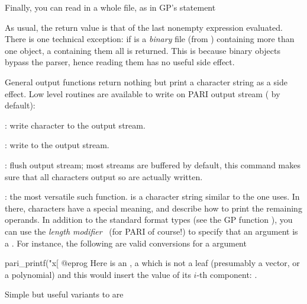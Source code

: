 Finally, you can read in a whole file, as in GP's  statement


\noindent As usual, the return value is that of the last nonempty expression
evaluated. There is one technical exception: if  is a \emph{binary}
file (from ) containing more than one object, a 
containing them all is returned. This is because binary objects bypass the
parser, hence reading them has no useful side effect.


General output functions return nothing but print a character string as a
side effect. Low level routines are available to write on PARI output stream
 ( by default):

: write character  to the output stream.

: write  to the output stream.

: flush output stream; most streams are buffered by
default, this command makes sure that all characters output so are actually
written.

: the most versatile such
function.  is a character string similar to the one
 uses. In there, \kbd{\%} characters have a special meaning, and
describe how to print the remaining operands. In addition to the standard
format types (see the GP function ), you can use the \emph{length
modifier}~ (for PARI of course!) to specify that an argument is a
. For instance, the following are valid conversions for a 
argument
\bprog

    pari_printf("x[%
@eprog\noindent
Here  is an ,  a  which is not a leaf
(presumably a vector, or a polynomial) and this would insert the value of its
$i$-th  component: .

\noindent Simple but useful variants to  are


